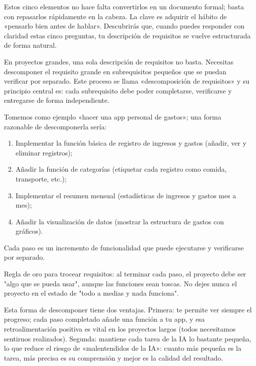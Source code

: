 Estos cinco elementos no hace falta convertirlos en un documento formal; basta con repasarlos rápidamente en la cabeza. La clave es adquirir el hábito de «pensarlo bien antes de hablar». Descubrirás que, cuando puedes responder con claridad estas cinco preguntas, tu descripción de requisitos se vuelve estructurada de forma natural.


En proyectos grandes, una sola descripción de requisitos no basta. Necesitas descomponer el requisito grande en subrequisitos pequeños que se puedan verificar por separado. Este proceso se llama «descomposición de requisitos» y su principio central es: cada subrequisito debe poder completarse, verificarse y entregarse de forma independiente.

Tomemos como ejemplo «hacer una app personal de gastos»; una forma razonable de descomponerla sería:

\begin{enumerate}
  \item Implementar la función básica de registro de ingresos y gastos (añadir, ver y eliminar registros);
  \item Añadir la función de categorías (etiquetar cada registro como comida, transporte, etc.);
  \item Implementar el resumen mensual (estadísticas de ingresos y gastos mes a mes);
  \item Añadir la visualización de datos (mostrar la estructura de gastos con gráficos).
\end{enumerate}

Cada paso es un incremento de funcionalidad que puede ejecutarse y verificarse por separado.

Regla de oro para trocear requisitos: al terminar cada paso, el proyecto debe ser "algo que se pueda usar", aunque las funciones sean toscas. No dejes nunca el proyecto en el estado de "todo a medias y nada funciona".

Esta forma de descomponer tiene dos ventajas. Primera: te permite ver siempre el progreso; cada paso completado añade una función a tu app, y esa retroalimentación positiva es vital en los proyectos largos (todos necesitamos sentirnos realizados). Segunda: mantiene cada tarea de la IA lo bastante pequeña, lo que reduce el riesgo de «malentendidos de la IA»: cuanto más pequeña es la tarea, más precisa es su comprensión y mejor es la calidad del resultado.


